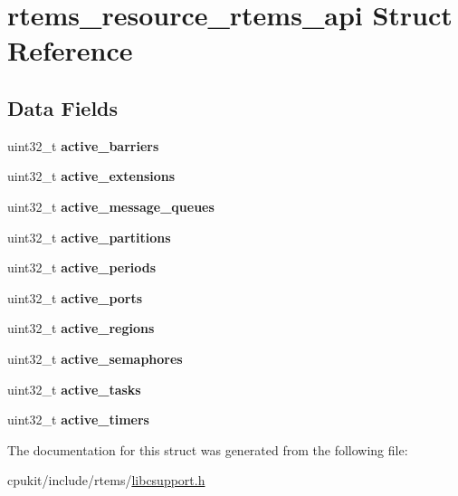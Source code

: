 \hypertarget{structrtems__resource__rtems__api}{}\section{rtems\+\_\+resource\+\_\+rtems\+\_\+api Struct Reference}
\label{structrtems__resource__rtems__api}
\subsection*{Data Fields}
\begin{DoxyCompactItemize}
\item 
\mbox{\label{structrtems__resource__rtems__api_a589855cab05aa16c705e045b20665d65}} 
uint32\+\_\+t {\bfseries active\+\_\+barriers}
\item 
\mbox{\label{structrtems__resource__rtems__api_a9bc9c9c57d51a5c0ffa84f19642917f2}} 
uint32\+\_\+t {\bfseries active\+\_\+extensions}
\item 
\mbox{\label{structrtems__resource__rtems__api_a1546900a9786f71620324fde50983c04}} 
uint32\+\_\+t {\bfseries active\+\_\+message\+\_\+queues}
\item 
\mbox{\label{structrtems__resource__rtems__api_a89b8ebef4c78c3df980efbee73727ee7}} 
uint32\+\_\+t {\bfseries active\+\_\+partitions}
\item 
\mbox{\label{structrtems__resource__rtems__api_a1bc67c39c9c2b7ab92a312dbb754d1a3}} 
uint32\+\_\+t {\bfseries active\+\_\+periods}
\item 
\mbox{\label{structrtems__resource__rtems__api_ab3e17ef48309a70df1d546fd95bc880c}} 
uint32\+\_\+t {\bfseries active\+\_\+ports}
\item 
\mbox{\label{structrtems__resource__rtems__api_a81254cb424f2774cfeea5db6ca52a353}} 
uint32\+\_\+t {\bfseries active\+\_\+regions}
\item 
\mbox{\label{structrtems__resource__rtems__api_a3e1f10926689df514a28318c703acc2b}} 
uint32\+\_\+t {\bfseries active\+\_\+semaphores}
\item 
\mbox{\label{structrtems__resource__rtems__api_ae30a8f1dd5409ec859b672765c7f4598}} 
uint32\+\_\+t {\bfseries active\+\_\+tasks}
\item 
\mbox{\label{structrtems__resource__rtems__api_a7dfa8782b2f583f5f6808f639bc81038}} 
uint32\+\_\+t {\bfseries active\+\_\+timers}
\end{DoxyCompactItemize}


The documentation for this struct was generated from the following file\+:\begin{DoxyCompactItemize}
\item 
cpukit/include/rtems/\mbox{\hyperlink{libcsupport_8h}{libcsupport.\+h}}\end{DoxyCompactItemize}
